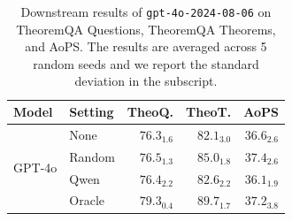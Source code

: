 \begin{table}[th]
    \small
    \centering
    \caption{
        Downstream results of \texttt{gpt-4o-2024-08-06} on TheoremQA Questions, TheoremQA Theorems, and AoPS.
        The results are averaged across 5 random seeds and we report the standard deviation in the subscript.
    }
    
    \begin{tabular}{llrrr}
        \toprule
        \textbf{Model} & \textbf{Setting} & \textbf{TheoQ.} & \textbf{TheoT.} & \textbf{AoPS} \\
        \midrule
        \multirow{4}{*}{GPT-4o} & None & $76.3_{1.6}$ & $82.1_{3.0}$ & $36.6_{2.6}$ \\
         & Random & $76.5_{1.3}$ & $85.0_{1.8}$ & $37.4_{2.6}$ \\
         & Qwen & $76.4_{2.2}$ & $82.6_{2.2}$ & $36.1_{1.9}$ \\
         & Oracle & $79.3_{0.4}$ & $89.7_{1.7}$ & $37.2_{3.8}$ \\
        \bottomrule
    \end{tabular}
\label{tab:qa_math}
\end{table}